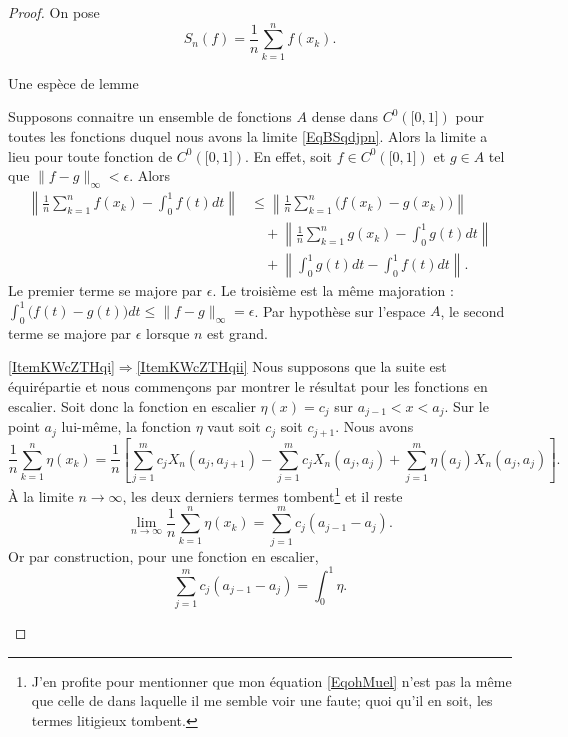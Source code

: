 \begin{proof}
    On pose 
    \begin{equation}
        S_n(f)=\frac{1}{ n }\sum_{k=1}^nf(x_k).
    \end{equation}


    \begin{subproof}
    \item[Une espèce de lemme]

        Supposons connaitre un ensemble de fonctions \( A\) dense dans \( C^0(\mathopen[ 0 , 1 \mathclose])\) pour toutes les fonctions duquel nous avons la limite \eqref{EqBSqdjpn}. Alors la limite a lieu pour toute fonction de \( C^0(\mathopen[ 0 , 1 \mathclose])\). En effet, soit \( f\in C^0(\mathopen[ 0 , 1 \mathclose])\) et \( g\in A\) tel que \( \| f-g \|_{\infty}<\epsilon\). Alors
        \begin{subequations}
            \begin{align}
                \left\|   \frac{1}{ n }\sum_{k=1}^nf(x_k)-\int_0^1f(t)dt  \right\|&\leq \left\| \frac{1}{ n }\sum_{k=1}^n\big( f(x_k)-g(x_k)\big) \right\|\\
                &\quad+ \left\| \frac{1}{ n }\sum_{k=1}^n  g(x_k)-\int_0^1g(t)dt   \right\|\\
                &\quad+ \left\| \int_0^1g(t)dt-\int_0^1f(t)dt \right\|.
            \end{align}
        \end{subequations}
        Le premier terme se majore par \( \epsilon\). Le troisième est la même majoration : \( \int_0^1\big(  f(t)-g(t)\big)dt\leq \| f-g \|_{\infty}=\epsilon\). Par hypothèse sur l'espace \( A\), le second terme se majore par \( \epsilon\) lorsque \( n\) est grand.
        

    \item[\ref{ItemKWcZTHqi}\( \Rightarrow\)\ref{ItemKWcZTHqii}]
    Nous supposons que la suite est équirépartie et nous commençons par montrer le résultat pour les fonctions en escalier. Soit donc la fonction en escalier \( \eta(x)=c_j\) sur \( a_{j-1}< x<a_j\). Sur le point \( a_j\) lui-même, la fonction \( \eta\) vaut soit \( c_j\) soit \( c_{j+1}\). Nous avons
    \begin{equation}    \label{EqohMuel}
        \frac{1}{ n }\sum_{k=1}^n\eta(x_k)=\frac{1}{ n }\left[  \sum_{j=1}^mc_jX_n(a_j,a_{j+1})-\sum_{j=1}^mc_jX_n(a_j,a_j)+\sum_{j=1}^m\eta(a_j)X_n(a_j,a_j) \right].
    \end{equation}
    À la limite \( n\to\infty\), les deux derniers termes tombent\footnote{J'en profite pour mentionner que mon équation \eqref{EqohMuel} n'est pas la même que celle de \cite{ytMOpe} dans laquelle il me semble voir une faute; quoi qu'il en soit, les termes litigieux tombent.} et il reste
    \begin{equation}
        \lim_{n\to \infty} \frac{1}{ n }\sum_{k=1}^n\eta(x_k)=\sum_{j=1}^mc_j(a_{j-1}-a_j).
    \end{equation}
    Or par construction, pour une fonction en escalier,
    \begin{equation}
        \sum_{j=1}^mc_j(a_{j-1}-a_j)=\int_0^1\eta.
    \end{equation}
    

\end{subproof}
\end{proof}
